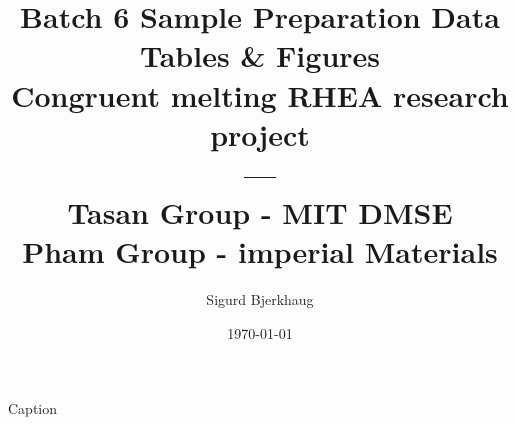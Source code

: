 \documentclass[a4]{article}
\title{Batch 6 Sample Preparation Data Tables \& Figures \\ Congruent melting RHEA research project \\ ---\\Tasan Group - MIT DMSE \\ Pham Group - imperial Materials \\}
\author{Sigurd Bjerkhaug}
\date{\today}
\begin{document}
\begin{table}[h]
    \centering
    
    \caption{Caption}
    \label{tab:my_label}
\end{table}
\end{document}

